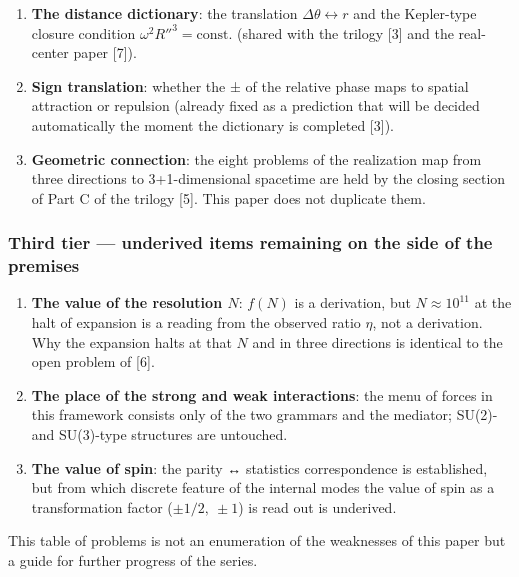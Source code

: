 \documentclass[
  a4paper,
]{article}
\providecommand{\tightlist}{%
  \setlength{\itemsep}{0pt}\setlength{\parskip}{0pt}}
\begin{document}
\begin{enumerate}
\def\labelenumi{\arabic{enumi}.}
\setcounter{enumi}{4}
\tightlist
\item
  \textbf{The distance dictionary}: the translation
  \(\Delta\theta\leftrightarrow r\) and the Kepler-type closure
  condition \(\omega^2R''^3=\text{const.}\) (shared with the trilogy
  {[}3{]} and the real-center paper {[}7{]}).
\item
  \textbf{Sign translation}: whether the ± of the relative phase maps to
  spatial attraction or repulsion (already fixed as a prediction that
  will be decided automatically the moment the dictionary is completed
  {[}3{]}).
\item
  \textbf{Geometric connection}: the eight problems of the realization
  map from three directions to 3+1-dimensional spacetime are held by the
  closing section of Part C of the trilogy {[}5{]}. This paper does not
  duplicate them.
\end{enumerate}

\subsubsection{Third tier --- underived items remaining on the side of
the
premises}\label{third-tier-underived-items-remaining-on-the-side-of-the-premises}

\begin{enumerate}
\def\labelenumi{\arabic{enumi}.}
\setcounter{enumi}{7}
\tightlist
\item
  \textbf{The value of the resolution \(N\)}: \(f(N)\) is a derivation,
  but \(N\approx10^{11}\) at the halt of expansion is a reading from the
  observed ratio \(\eta\), not a derivation. Why the expansion halts at
  that \(N\) and in three directions is identical to the open problem of
  {[}6{]}.
\item
  \textbf{The place of the strong and weak interactions}: the menu of
  forces in this framework consists only of the two grammars and the
  mediator; SU(2)- and SU(3)-type structures are untouched.
\item
  \textbf{The value of spin}: the parity ↔ statistics correspondence is
  established, but from which discrete feature of the internal modes the
  value of spin as a transformation factor (\(\pm1/2,\ \pm1\)) is read
  out is underived.
\end{enumerate}

This table of problems is not an enumeration of the weaknesses of this
paper but a guide for further progress of the series.
\end{document}

